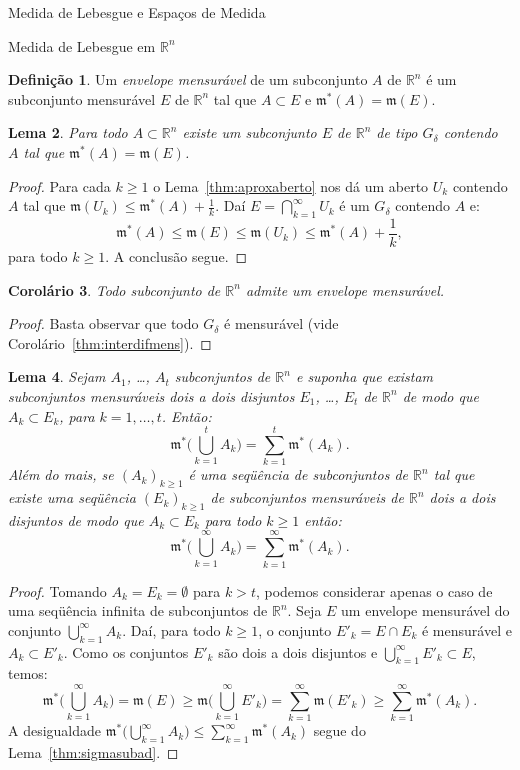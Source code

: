 \documentclass[oneside,final,11pt]{amsbook}
\newcommand{\R}{\mathds R}
\newcommand{\leb}{\mathfrak m}
\theoremstyle{remark}\newtheorem{exercise}{Exercício}[chapter]
\theoremstyle{remark}\newtheorem{*exercise}[exercise]{\hbox to 0pt{\hskip 0pt minus 1fil*}Exercício}
\theoremstyle{definition}\newtheorem{exdefin}{Definição}[chapter]
\theoremstyle{plain}\newtheorem{teo}{Teorema}[section]
\theoremstyle{plain}\newtheorem{lem}[teo]{Lema}
\theoremstyle{plain}\newtheorem{prop}[teo]{Proposição}
\theoremstyle{plain}\newtheorem{cor}[teo]{Corolário}
\theoremstyle{definition}\newtheorem{defin}[teo]{Definição}
\theoremstyle{remark}\newtheorem{rem}[teo]{Observação}
\theoremstyle{definition}\newtheorem{notation}[teo]{Notação}
\theoremstyle{definition}\newtheorem{convention}[teo]{Convenção}
\theoremstyle{definition}\newtheorem{example}[teo]{Exemplo}
\numberwithin{section}{chapter}
\numberwithin{equation}{section}
\begin{document}
\begin{chapter}{Medida de Lebesgue e Espaços de Medida}
\begin{section}[Medida de Lebesgue em $\R^n$]{Medida de Lebesgue em ${\R^n}$}
\begin{defin}
Um {\em envelope mensurável\/}%
 de um subconjunto $A$ de $\R^n$ é um subconjunto
mensurável $E$ de $\R^n$ tal que $A\subset E$ e $\leb^*(A)=\leb(E)$.
\end{defin}

\begin{lem}\label{thm:aproxGdelta}
Para todo $A\subset\R^n$ existe um subconjunto $E$ de $\R^n$ de tipo $G_\delta$ contendo $A$
tal que $\leb^*(A)=\leb(E)$.
\end{lem}
\begin{proof}
Para cada $k\ge1$ o Lema~\ref{thm:aproxaberto} nos dá um aberto $U_k$ contendo $A$ tal que
$\leb(U_k)\le\leb^*(A)+\frac1k$. Daí $E=\bigcap_{k=1}^\infty U_k$ é um $G_\delta$ contendo $A$ e:
\[\leb^*(A)\le\leb(E)\le\leb(U_k)\le\leb^*(A)+\frac1k,\]
para todo $k\ge1$. A conclusão segue.
\end{proof}

\begin{cor}
Todo subconjunto de $\R^n$ admite um envelope mensurável.
\end{cor}
\begin{proof}
Basta observar que todo $G_\delta$ é mensurável (vide Corolário~\ref{thm:interdifmens}).
\end{proof}

\begin{lem}\label{thm:envelopesdisjuntos}
Sejam $A_1$, \dots, $A_t$ subconjuntos de $\R^n$ e suponha que existam subconjuntos mensuráveis dois a dois disjuntos
$E_1$, \dots, $E_t$ de $\R^n$ de modo que $A_k\subset E_k$, para $k=1,\ldots,t$. Então:
\[\leb^*\Big(\bigcup_{k=1}^tA_k\Big)=\sum_{k=1}^t\leb^*(A_k).\]
Além do mais, se $(A_k)_{k\ge1}$ é uma seqüência de subconjuntos de $\R^n$ tal que existe uma seqüência
$(E_k)_{k\ge1}$ de subconjuntos mensuráveis de $\R^n$ dois a dois disjuntos de modo que $A_k\subset E_k$ para todo $k\ge1$
então:
\[\leb^*\Big(\bigcup_{k=1}^\infty A_k\Big)=\sum_{k=1}^\infty\leb^*(A_k).\]
\end{lem}
\begin{proof}
Tomando $A_k=E_k=\emptyset$ para $k>t$, podemos considerar apenas o caso de uma seqüência infinita de subconjuntos
de $\R^n$. Seja $E$ um envelope mensurável do conjunto $\bigcup_{k=1}^\infty A_k$. Daí, para todo $k\ge1$, o conjunto
$E'_k=E\cap E_k$ é mensurável e $A_k\subset E'_k$.
Como os conjuntos $E'_k$ são dois a dois disjuntos e $\bigcup_{k=1}^\infty E'_k\subset E$, temos:
\[\leb^*\Big(\bigcup_{k=1}^\infty A_k\Big)=\leb(E)\ge\leb\Big(\bigcup_{k=1}^\infty E'_k\Big)
=\sum_{k=1}^\infty\leb(E'_k)\ge\sum_{k=1}^\infty\leb^*(A_k).\]
A desigualdade $\leb^*\big(\bigcup_{k=1}^\infty A_k\big)\le\sum_{k=1}^\infty\leb^*(A_k)$ segue do Lema~\ref{thm:sigmasubad}.
\end{proof}


\end{section}
\end{chapter}
\end{document}
